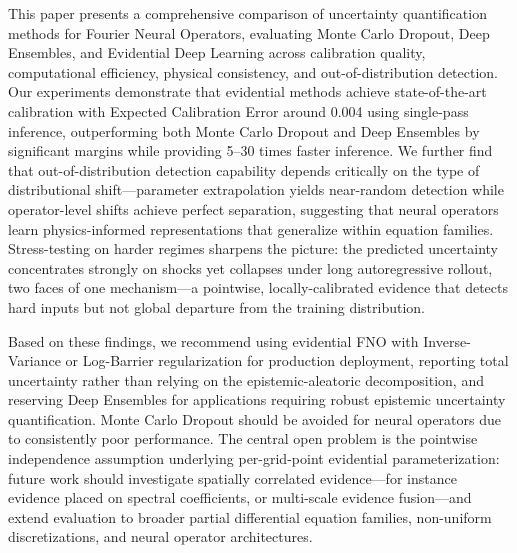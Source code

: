 This paper presents a comprehensive comparison of uncertainty quantification methods for Fourier Neural Operators, 
evaluating Monte Carlo Dropout, Deep Ensembles, and Evidential Deep Learning across calibration quality,
computational efficiency, physical consistency, and out-of-distribution detection. Our experiments demonstrate
that evidential methods achieve state-of-the-art calibration with Expected Calibration Error around 0.004 using
single-pass inference, outperforming both Monte Carlo Dropout and Deep Ensembles by significant margins while
providing 5--30 times faster inference. We further find that out-of-distribution detection capability depends
critically on the type of distributional shift---parameter extrapolation yields near-random detection while
operator-level shifts achieve perfect separation, suggesting that neural operators learn physics-informed
representations that generalize within equation families. Stress-testing on harder regimes sharpens the picture:
the predicted uncertainty concentrates strongly on shocks yet collapses under long autoregressive rollout, two
faces of one mechanism---a pointwise, locally-calibrated evidence that detects hard inputs but not global
departure from the training distribution.

Based on these findings, we recommend using evidential FNO with Inverse-Variance or Log-Barrier regularization for 
production deployment, reporting total uncertainty rather than relying on the epistemic-aleatoric decomposition,
and reserving Deep Ensembles for applications requiring robust epistemic uncertainty quantification. Monte Carlo
Dropout should be avoided for neural operators due to consistently poor performance. The central open problem is
the pointwise independence assumption underlying per-grid-point evidential parameterization: future work should
investigate spatially correlated evidence---for instance evidence placed on spectral coefficients, or
multi-scale evidence fusion---and extend evaluation to broader partial differential equation families,
non-uniform discretizations, and neural operator architectures.